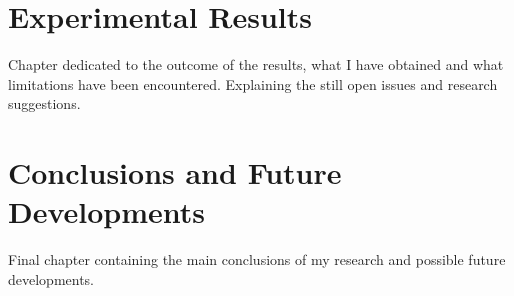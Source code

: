 \documentclass{Configuration_Files/PoliMi3i_thesis}
\begin{document}


    \chapter{Experimental Results}
    \label{ch:chapter_six}%

    Chapter dedicated to the outcome of the results, what I have obtained and what limitations have been encountered.
    Explaining the still open issues and research suggestions.




    \chapter{Conclusions and Future Developments}
    \label{ch:conclusions}%
    Final chapter containing the main conclusions of my research
    and possible future developments.




    \cleardoublepage
    \appendix

%
%
%
\end{document}
